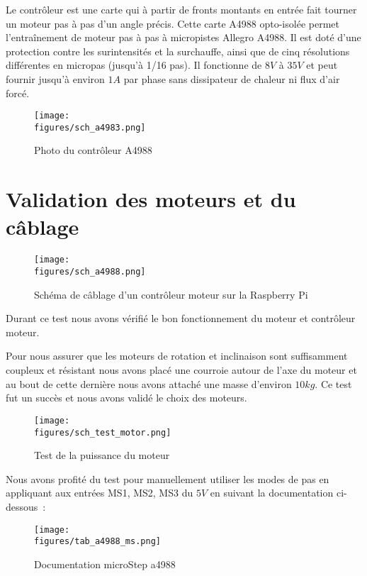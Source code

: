 Le contrôleur est une carte qui à partir de fronts montants en entrée fait tourner un moteur pas à pas d'un angle précis. Cette carte A4988 opto-isolée permet l'entraînement de moteur pas à pas à micropistes Allegro A4988. Il est doté d'une protection contre les surintensités et la surchauffe, ainsi que de cinq résolutions différentes en micropas (jusqu'à 1/16 pas). Il fonctionne de $8V$ à $35V$ et peut fournir jusqu'à environ $1A$ par phase sans dissipateur de chaleur ni flux d'air forcé.

\begin{figure}[H]
    \centering
    \texttt{[image: \\figures/sch\_a4983.png]}
    \decoRule
    \caption[
    Photo du contrôleur A4988]{
    Photo du contrôleur A4988}
    \label{fig:Photo du contrôleur A4988}
    \end{figure}

\section{Validation des moteurs et du câblage}

\begin{figure}[H]
    \centering
    \texttt{[image: \\figures/sch\_a4988.png]}
    \decoRule
    \caption[
    Schéma de câblage d'un contrôleur moteur sur la Raspberry Pi]{
    Schéma de câblage d'un contrôleur moteur sur la Raspberry Pi}
    \label{fig:Schéma de câblage d'un contrôleur moteur sur la Raspberry Pi}
    \end{figure}

Durant ce test nous avons vérifié le bon fonctionnement du moteur et contrôleur moteur.

Pour nous assurer que les moteurs de rotation et inclinaison sont suffisamment coupleux et résistant nous avons placé une courroie autour de l'axe du moteur et au bout de cette dernière nous avons attaché une masse d'environ $10kg$.
Ce test fut un succès et nous avons validé le choix des moteurs.

\begin{figure}[H]
    \centering
    \texttt{[image: \\figures/sch\_test\_motor.png]}
    \decoRule
    \caption[
    Test de la puissance du moteur]{
    Test de la puissance du moteur}
    \label{fig:Test de la puissance du moteur}
    \end{figure}

Nous avons profité du test pour manuellement utiliser les modes de pas en appliquant aux entrées MS1, MS2, MS3 du $5V$ en suivant la documentation ci-dessous~:

\begin{figure}[H]
    \centering
    \texttt{[image: \\figures/tab\_a4988\_ms.png]}
    \decoRule
    \caption[
    Documentation microStep a4988]{
    Documentation microStep a4988}
    \label{fig:Documentation microStep a4988}
    \end{figure}

